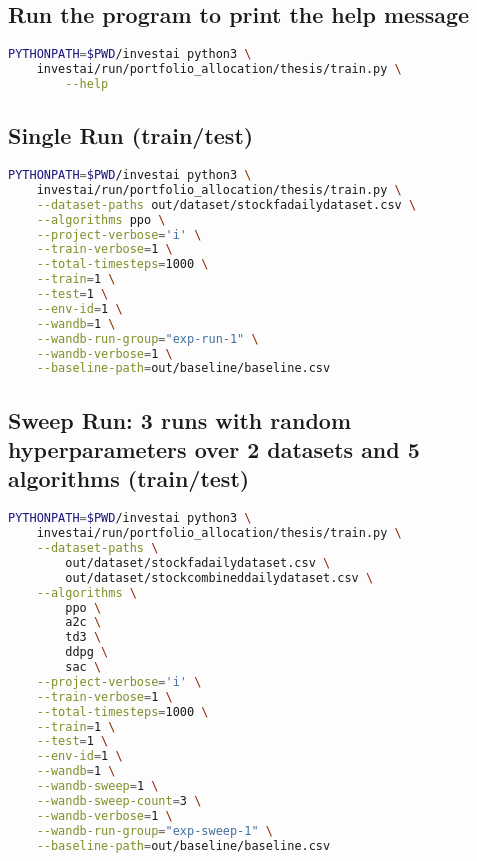 \documentclass[../xlapes02]{subfiles}
\begin{document}
    \subsection{Run the program to print the help message}
    \begin{lstlisting}[language=bash]
PYTHONPATH=$PWD/investai python3 \
    investai/run/portfolio_allocation/thesis/train.py \
        --help
    \end{lstlisting}

    \subsection{Single Run (train/test)}
    \begin{lstlisting}[language=bash]
PYTHONPATH=$PWD/investai python3 \
    investai/run/portfolio_allocation/thesis/train.py \
    --dataset-paths out/dataset/stockfadailydataset.csv \
    --algorithms ppo \
    --project-verbose='i' \
    --train-verbose=1 \
    --total-timesteps=1000 \
    --train=1 \
    --test=1 \
    --env-id=1 \
    --wandb=1 \
    --wandb-run-group="exp-run-1" \
    --wandb-verbose=1 \
    --baseline-path=out/baseline/baseline.csv
    \end{lstlisting}

    \subsection{Sweep Run: 3 runs with random hyperparameters over 2 datasets and 5 algorithms (train/test)}
    \begin{lstlisting}[language=bash]
PYTHONPATH=$PWD/investai python3 \
    investai/run/portfolio_allocation/thesis/train.py \
    --dataset-paths \
        out/dataset/stockfadailydataset.csv \
        out/dataset/stockcombineddailydataset.csv \
    --algorithms \
        ppo \
        a2c \
        td3 \
        ddpg \
        sac \
    --project-verbose='i' \
    --train-verbose=1 \
    --total-timesteps=1000 \
    --train=1 \
    --test=1 \
    --env-id=1 \
    --wandb=1 \
    --wandb-sweep=1 \
    --wandb-sweep-count=3 \
    --wandb-verbose=1 \
    --wandb-run-group="exp-sweep-1" \
    --baseline-path=out/baseline/baseline.csv
    \end{lstlisting}
\end{document}
